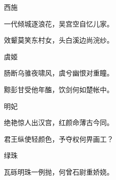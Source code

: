 \begin{poem}
    \begin{pl}
        西施
    \end{pl}


    \begin{pl}

        一代倾城逐浪花，吴宫空自忆儿家。
    \end{pl}


    \begin{pl}

        效颦莫笑东村女，头白溪边尚浣纱。
    \end{pl}


    \emptypl


    \begin{pl}


        虞姬
    \end{pl}


    \begin{pl}

        肠断乌骓夜啸风，虞兮幽恨对重瞳。
    \end{pl}


    \begin{pl}

        黥彭甘受他年醢，饮剑何如楚帐中。
    \end{pl}

    \emptypl

    \begin{pl}


        明妃
    \end{pl}


    \begin{pl}

        绝艳惊人出汉宫，红颜命薄古今同。
    \end{pl}


    \begin{pl}

        君王纵使轻颜色，予夺权何畀画工？
    \end{pl}

    \emptypl

    \begin{pl}


        绿珠
    \end{pl}


    \begin{pl}

        瓦砾明珠一例抛，何曾石尉重娇娆。
    \end{pl}



\end{poem}
